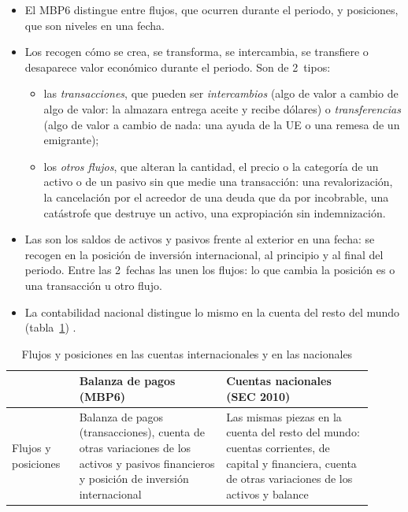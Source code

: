 \documentclass[11pt]{article}
\begin{document}
\begin{itemize}
\item El MBP6 distingue entre flujos, que ocurren durante el periodo, y posiciones, que son niveles en una fecha\nocite{FMI2009MBP6}.
\item Los  recogen cómo se crea, se transforma, se intercambia, se transfiere o desaparece valor económico durante el periodo. Son de 2~tipos:
  \begin{itemize}
  \item las \emph{transacciones}, que pueden ser \emph{intercambios} (algo de valor a cambio de algo de valor: la almazara entrega aceite y recibe dólares) o \emph{transferencias} (algo de valor a cambio de nada: una ayuda de la UE o una remesa de un emigrante);
  \item los \emph{otros flujos}, que alteran la cantidad, el precio o la categoría de un activo o de un pasivo sin que medie una transacción: una revalorización, la cancelación por el acreedor de una deuda que da por incobrable, una catástrofe que destruye un activo, una expropiación sin indemnización.
  \end{itemize}
\item Las  son los saldos de activos y pasivos frente al exterior en una fecha: se recogen en la posición de inversión internacional, al principio y al final del periodo. Entre las 2~fechas las unen los flujos: lo que cambia la posición es o una transacción u otro flujo.
\item La contabilidad nacional distingue lo mismo en la cuenta del resto del mundo (tabla~\ref{tab:flujos-sec2010}) .
\end{itemize}

\begin{table}[H]
\centering
\caption{Flujos y posiciones en las cuentas internacionales y en las nacionales}\label{tab:flujos-sec2010}
\renewcommand{\arraystretch}{1.25}
\small
\begin{tabular}{>{\raggedright\arraybackslash}m{0.17\linewidth}>{\raggedright\arraybackslash}m{0.37\linewidth}>{\raggedright\arraybackslash}m{0.37\linewidth}}
\toprule
\rowcolor{tceeazulpalido}
 & \textbf{Balanza de pagos (MBP6)} & \textbf{Cuentas nacionales (SEC 2010)}\\
\midrule
Flujos y posiciones & Balanza de pagos (transacciones), cuenta de otras variaciones de los activos y pasivos financieros y posición de inversión internacional & Las mismas piezas en la cuenta del resto del mundo: cuentas corrientes, de capital y financiera, cuenta de otras variaciones de los activos y balance\\
\bottomrule
\end{tabular}
\end{table}
\end{document}
